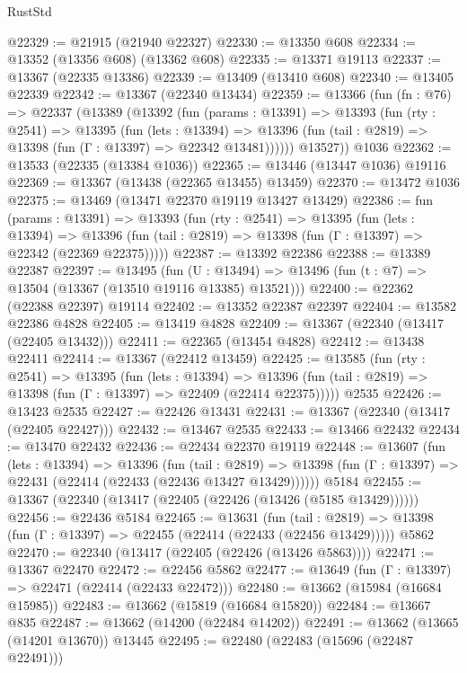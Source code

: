 \begin{lexlean}{RustStd}
\begin{coremodule}
@22329 := @21915 (@21940 @22327)
@22330 := @13350 @608
@22334 := @13352 (@13356 @608) (@13362 @608)
@22335 := @13371 @19113
@22337 := @13367 (@22335 @13386)
@22339 := @13409 (@13410 @608)
@22340 := @13405 @22339
@22342 := @13367 (@22340 @13434)
@22359 := @13366
    (fun (fn : @76) =>
    @22337
      (@13389
        (@13392
          (fun (params : @13391) =>
          @13393
            (fun (rty : @2541) =>
            @13395
              (fun (lets : @13394) =>
              @13396 (fun (tail : @2819) => @13398 (fun (Γ : @13397) => @22342 @13481))))))
        @13527))
    @1036
@22362 := @13533 (@22335 (@13384 @1036))
@22365 := @13446 (@13447 @1036) @19116
@22369 := @13367 (@13438 (@22365 @13455) @13459)
@22370 := @13472 @1036
@22375 := @13469 (@13471 @22370 @19119 @13427 @13429)
@22386 := fun (params : @13391) =>
  @13393
    (fun (rty : @2541) =>
    @13395
      (fun (lets : @13394) =>
      @13396 (fun (tail : @2819) => @13398 (fun (Γ : @13397) => @22342 (@22369 @22375)))))
@22387 := @13392 @22386
@22388 := @13389 @22387
@22397 := @13495
    (fun (U : @13494) => @13496 (fun (t : @7) => @13504 (@13367 (@13510 @19116 @13385) @13521)))
@22400 := @22362 (@22388 @22397) @19114
@22402 := @13352 @22387 @22397
@22404 := @13582 @22386 @4828
@22405 := @13419 @4828
@22409 := @13367 (@22340 (@13417 (@22405 @13432)))
@22411 := @22365 (@13454 @4828)
@22412 := @13438 @22411
@22414 := @13367 (@22412 @13459)
@22425 := @13585
    (fun (rty : @2541) =>
    @13395
      (fun (lets : @13394) =>
      @13396 (fun (tail : @2819) => @13398 (fun (Γ : @13397) => @22409 (@22414 @22375)))))
    @2535
@22426 := @13423 @2535
@22427 := @22426 @13431
@22431 := @13367 (@22340 (@13417 (@22405 @22427)))
@22432 := @13467 @2535
@22433 := @13466 @22432
@22434 := @13470 @22432
@22436 := @22434 @22370 @19119
@22448 := @13607
    (fun (lets : @13394) =>
    @13396
      (fun (tail : @2819) =>
      @13398 (fun (Γ : @13397) => @22431 (@22414 (@22433 (@22436 @13427 @13429))))))
    @5184
@22455 := @13367 (@22340 (@13417 (@22405 (@22426 (@13426 (@5185 @13429))))))
@22456 := @22436 @5184
@22465 := @13631
    (fun (tail : @2819) => @13398 (fun (Γ : @13397) => @22455 (@22414 (@22433 (@22456 @13429)))))
    @5862
@22470 := @22340 (@13417 (@22405 (@22426 (@13426 @5863))))
@22471 := @13367 @22470
@22472 := @22456 @5862
@22477 := @13649 (fun (Γ : @13397) => @22471 (@22414 (@22433 @22472)))
@22480 := @13662 (@15984 (@16684 @15985))
@22483 := @13662 (@15819 (@16684 @15820))
@22484 := @13667 @835
@22487 := @13662 (@14200 (@22484 @14202))
@22491 := @13662 (@13665 (@14201 @13670)) @13445
@22495 := @22480 (@22483 (@15696 (@22487 @22491)))

\end{coremodule}
\end{lexlean}
